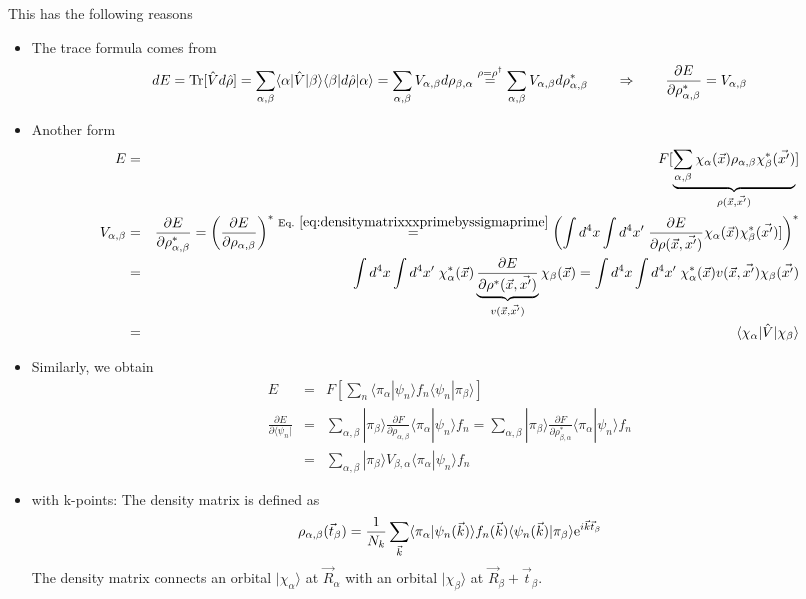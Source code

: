 \documentclass[11pt,a4paper]{report}
\begin{document}
This has the following reasons
\begin{itemize}
\item The trace formula comes from
\begin{eqnarray*}
dE=\mathrm{Tr}[\hat{V}d\hat{\rho}]
=\sum_{\alpha,\beta}
\langle\alpha|\hat{V}|\beta\rangle
\langle\beta|d\hat{\rho}|\alpha\rangle
=\sum_{\alpha,\beta}
V_{\alpha,\beta}d\rho_{\beta,\alpha}
\stackrel{\rho=\rho^\dagger}{=}\sum_{\alpha,\beta}
V_{\alpha,\beta}d\rho^*_{\alpha,\beta}
\qquad\Rightarrow\qquad
\frac{\partial E}{\partial\rho_{\alpha,\beta}^*}=V_{\alpha,\beta}
\end{eqnarray*}
\item Another form
\begin{eqnarray*}
E&=&F[\underbrace{\sum_{\alpha,\beta}\chi_\alpha(\vec{x})\rho_{\alpha,\beta}\chi^*_\beta(\vec{x'})}
_{\rho(\vec{x},\vec{x'})}]
\\
V_{\alpha,\beta}&=&
\frac{\partial E}{\partial\rho_{\alpha,\beta}^*}
=\biggl(\frac{\partial E}{\partial\rho_{\alpha,\beta}}\biggr)^*
\eqrel{eq:densitymatrixxxprimebyssigmaprime}{=}\biggl(\int d^4x\int d^4x'\;
\frac{\partial E}{\partial\rho(\vec{x},\vec{x'})}
\chi_\alpha(\vec{x})\chi^*_\beta(\vec{x'})]\biggr)^*
\\
&=&\int d^4x\int d^4x'\;
\chi^*_\alpha(\vec{x})
\underbrace{\frac{\partial E}{\partial\rho^*(\vec{x},\vec{x'})}}_{v(\vec{x},\vec{x'})}
\chi_\beta(\vec{x})
=\int d^4x\int d^4x'\;\chi^*_\alpha(\vec{x})v(\vec{x},\vec{x'})\chi_\beta(\vec{x'})
\\
&=&\langle\chi_\alpha|\hat{V}|\chi_\beta\rangle
\end{eqnarray*}
\item
Similarly, we obtain
\begin{eqnarray*}
E&=&F[\sum_n\langle\pi_\alpha|\psi_n\rangle f_n\langle\psi_n|\pi_\beta\rangle]
\\
\frac{\partial E}{\partial\langle\psi_n|}
&=&
\sum_{\alpha,\beta}|\pi_\beta\rangle \frac{\partial F}{\partial\rho_{\alpha,\beta}}
\langle\pi_\alpha|\psi_n\rangle f_n
=\sum_{\alpha,\beta}|\pi_\beta\rangle \frac{\partial F}{\partial\rho^*_{\beta,\alpha}}
\langle\pi_\alpha|\psi_n\rangle f_n
\\
&=&\sum_{\alpha,\beta}|\pi_\beta\rangle V_{\beta,\alpha}
\langle\pi_\alpha|\psi_n\rangle f_n
\end{eqnarray*}
\item with k-points: The density matrix is defined as
\begin{eqnarray*}
\rho_{\alpha,\beta}(\vec{t}_\beta)=\frac{1}{N_k}\sum_{\vec{k}} 
\langle\pi_\alpha|\psi_n(\vec{k})\rangle f_n(\vec{k})
\langle\psi_n(\vec{k})|\pi_\beta\rangle\mathrm{e}^{i\vec{k}\vec{t}_\beta}
\end{eqnarray*}
The density matrix connects an orbital $|\chi_\alpha\rangle$ at
$\vec{R}_\alpha$ with an orbital $|\chi_\beta\rangle$ at
$\vec{R}_\beta+\vec{t}_\beta$.



\end{itemize}
\end{document}
